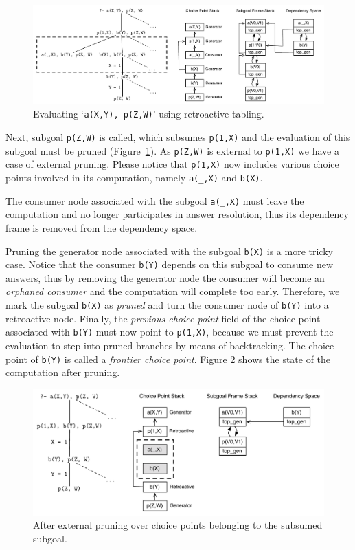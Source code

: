 \begin{figure}[ht]
  \centering
    \includegraphics[scale=0.5]{retro_example2.pdf}
  \caption{Evaluating `\texttt{a(X,Y),~p(Z,W)}' using retroactive tabling.}
  \label{fig:retro_eval2}
\end{figure}

Next, subgoal \texttt{p(Z,W)} is called, which subsumes \texttt{p(1,X)} and the evaluation of this subgoal
must be pruned (Figure~\ref{fig:retro_eval2}). As \texttt{p(Z,W)} is external to \texttt{p(1,X)} we have
a case of external pruning. Please notice that \texttt{p(1,X)} now includes various choice
points involved in its computation, namely \texttt{a(\_,X)} and \texttt{b(X)}.

The consumer node associated with the subgoal \texttt{a(\_,X)} must leave the computation and no longer
participates in answer resolution, thus its dependency frame is removed from the dependency space.

Pruning the generator node associated with the subgoal \texttt{b(X)} is a more tricky case. Notice that
the consumer \texttt{b(Y)} depends on this subgoal to consume new answers, thus by removing the generator node
the consumer will become an \textit{orphaned consumer} and the computation will complete too early.
Therefore, we mark the subgoal \texttt{b(X)} as \textit{pruned} and turn the consumer node of \texttt{b(Y)}
into a retroactive node. Finally, the \textit{previous choice point} field of the choice point associated
with \texttt{b(Y)} must now point to \texttt{p(1,X)}, because we must prevent the evaluation to step into
pruned branches by means of backtracking. The choice point of \texttt{b(Y)} is called a
\textit{frontier choice point}. Figure \ref{fig:retro_eval3} shows the state of the computation after pruning.

\begin{figure}[ht]
  \centering
    \includegraphics[scale=0.5]{retro_example3.pdf}
  \caption{After external pruning over choice points belonging to the subsumed subgoal.}
  \label{fig:retro_eval3}
\end{figure}

